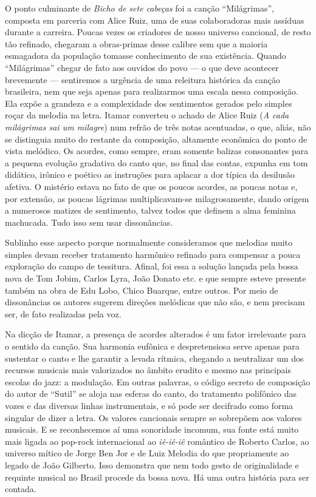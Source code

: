 O ponto culminante de \textit{Bicho de sete cabeças} foi a canção ``Milágrimas'', composta em parceria com Alice Ruiz, uma de suas colaboradoras mais
assíduas durante a carreira. Poucas vezes os criadores de nosso universo
cancional, de resto tão refinado, chegaram a obras-primas desse calibre
sem que a maioria esmagadora da população tomasse conhecimento de sua
existência. Quando ``Milágrimas'' chegar de fato aos ouvidos do povo --- o que
deve acontecer brevemente --- sentiremos a urgência de uma releitura
histórica da canção brasileira, nem que seja apenas para realizarmos uma
escala nessa composição. Ela expõe a grandeza e a complexidade dos
sentimentos gerados pelo simples roçar da melodia na letra. Itamar
converteu o achado de Alice Ruiz (\textit{A cada milágrimas sai um milagre})
num refrão de três notas acentuadas, o que, aliás, não se distinguia
muito do restante da composição, altamente econômica do ponto de vista
melódico. Os acordes, como sempre, eram somente balizas consonantes para
a pequena evolução gradativa do canto que, no final das contas, expunha
em tom didático, irônico e poético as instruções para aplacar a dor
típica da desilusão afetiva. O mistério estava no fato de que os poucos
acordes, as poucas notas e, por extensão, as poucas lágrimas
multiplicavam-se milagrosamente, dando origem a numerosos matizes de
sentimento, talvez todos que definem a alma feminina machucada. Tudo
isso sem usar dissonâncias.

Sublinho esse aspecto porque normalmente consideramos que melodias muito
simples devam receber tratamento harmônico refinado para compensar a
pouca exploração do campo de tessitura. Afinal, foi essa a solução
lançada pela bossa nova de Tom Jobim, Carlos Lyra, João Donato etc. e
que sempre esteve presente também na obra de Edu Lobo, Chico Buarque,
entre outros. Por meio de dissonâncias os autores sugerem direções
melódicas que não são, e nem precisam ser, de fato realizadas pela voz.

Na dicção de Itamar, a presença de acordes alterados é um fator
irrelevante para o sentido da canção. Sua harmonia eufônica e
despretensiosa serve apenas para sustentar o canto e lhe garantir a
levada rítmica, chegando a neutralizar um dos recursos musicais mais
valorizados no âmbito erudito e mesmo nas principais escolas do jazz: a
modulação. Em outras palavras, o código secreto de composição do autor
de ``Sutil'' se aloja nas esferas do canto, do tratamento polifônico das
vozes e das diversas linhas instrumentais, e só pode ser decifrado como
forma singular de dizer a letra. Os valores cancionais sempre se
sobrepõem aos valores musicais. E se reconhecemos aí uma sonoridade
incomum, sua fonte está muito mais ligada ao pop-rock internacional ao
\textit{iê-iê-iê} romântico de Roberto Carlos, ao universo mítico de Jorge Ben
Jor e de Luiz Melodia do que propriamente ao legado de João Gilberto.
Isso demonstra que nem todo gesto de originalidade e requinte musical
no Brasil procede da bossa nova. Há uma outra história para ser contada.

